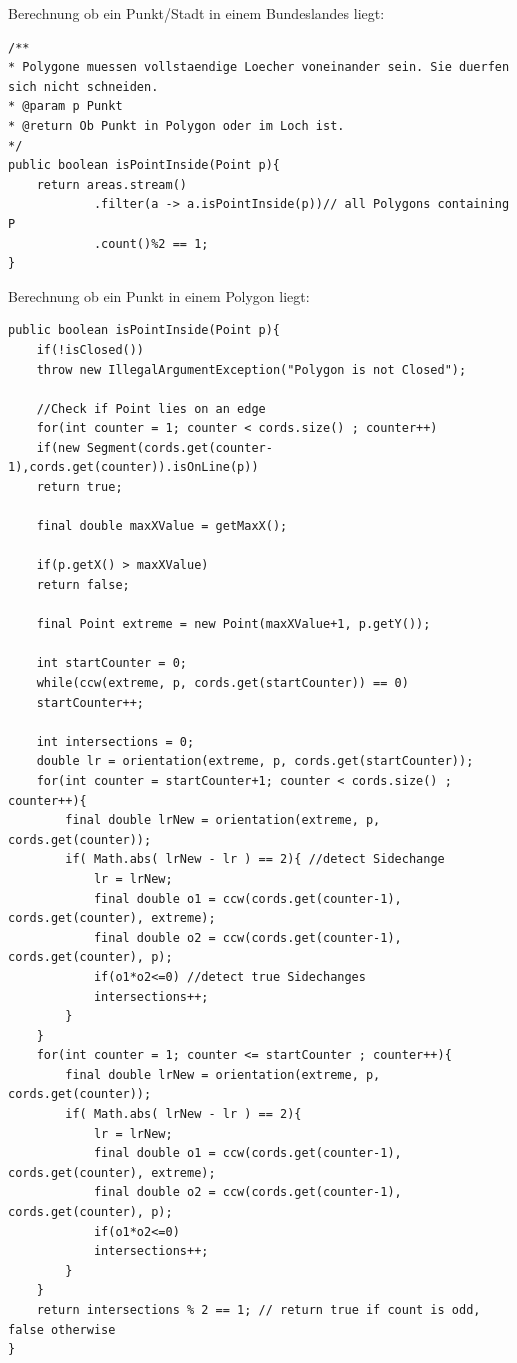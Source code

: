 \documentclass[conference]{IEEEtran}
\begin{document}
	Berechnung ob ein Punkt/Stadt in einem Bundeslandes liegt:
	\begin{lstlisting}[basicstyle=\tiny]
/**
* Polygone muessen vollstaendige Loecher voneinander sein. Sie duerfen sich nicht schneiden.
* @param p Punkt
* @return Ob Punkt in Polygon oder im Loch ist.
*/
public boolean isPointInside(Point p){
    return areas.stream() 
			.filter(a -> a.isPointInside(p))// all Polygons containing P 
			.count()%2 == 1;
}
	\end{lstlisting}
	Berechnung ob ein Punkt in einem Polygon liegt:
\begin{lstlisting}[basicstyle=\tiny]
public boolean isPointInside(Point p){
	if(!isClosed())
	throw new IllegalArgumentException("Polygon is not Closed");
	
	//Check if Point lies on an edge
	for(int counter = 1; counter < cords.size() ; counter++)
	if(new Segment(cords.get(counter-1),cords.get(counter)).isOnLine(p))
	return true;          
	
	final double maxXValue = getMaxX();
	
	if(p.getX() > maxXValue)
	return false;
	
	final Point extreme = new Point(maxXValue+1, p.getY());
	
	int startCounter = 0;
	while(ccw(extreme, p, cords.get(startCounter)) == 0)
	startCounter++;
	
	int intersections = 0;
	double lr = orientation(extreme, p, cords.get(startCounter));
	for(int counter = startCounter+1; counter < cords.size() ; counter++){
		final double lrNew = orientation(extreme, p, cords.get(counter));
		if( Math.abs( lrNew - lr ) == 2){ //detect Sidechange 
			lr = lrNew;
			final double o1 = ccw(cords.get(counter-1), cords.get(counter), extreme);
			final double o2 = ccw(cords.get(counter-1), cords.get(counter), p);
			if(o1*o2<=0) //detect true Sidechanges
			intersections++;
		}
	}
	for(int counter = 1; counter <= startCounter ; counter++){
		final double lrNew = orientation(extreme, p, cords.get(counter));
		if( Math.abs( lrNew - lr ) == 2){
			lr = lrNew;
			final double o1 = ccw(cords.get(counter-1), cords.get(counter), extreme);
			final double o2 = ccw(cords.get(counter-1), cords.get(counter), p);
			if(o1*o2<=0)
			intersections++;
		}
	}
	return intersections % 2 == 1; // return true if count is odd, false otherwise
}
\end{lstlisting}

	
\end{document}
